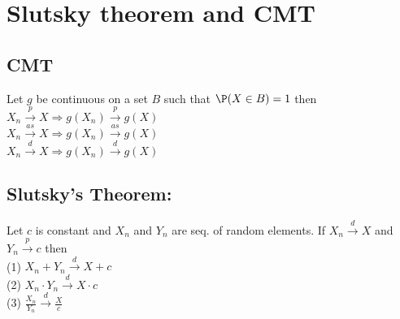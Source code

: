 \section{Slutsky theorem and CMT}
\subsection{CMT}
	Let $g$ be continuous on a set $B$ such that $\P(X\in B)=1$
	then \\
	$X_n \xrightarrow{p} X \Rightarrow g(X_n)\xrightarrow{p} g(X)$ \\
	$X_n \xrightarrow{as} X \Rightarrow g(X_n)\xrightarrow{as} g(X)$ \\
	$X_n \xrightarrow{d} X \Rightarrow g(X_n)\xrightarrow{d} g(X)$ \\


\subsection{Slutsky's Theorem:}
	Let $c$ is constant and $X_n$ and $Y_n$ are seq. of random elements.
	If $X_n \xrightarrow{d} X$ and $Y_n \xrightarrow{p} c$ then \\
	(1)  $X_n + Y_n \xrightarrow{d}  X + c$ \\
	(2)  $X_n \cdot Y_n \xrightarrow{d}  X \cdot c$ \\
	(3)  $\frac{X_n}{Y_n} \xrightarrow{d} \frac{X}{c}$\\

